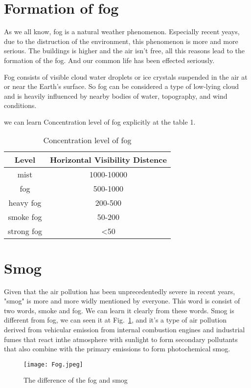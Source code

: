 \documentclass[10pt,twocolumn,letterpaper]{article}
\begin{document}
\section{Formation of fog}
 \par As we all know, fog is a natural weather phenomenon. Especially recent yeays, due to the distruction of the   environment, this phenomenon is more and more serious. The buildings is higher and the air isn't free, all this reasons lead to the formation of the fog. And our common life has been effected seriously. 
 \par Fog consists of visible cloud water droplets or ice crystals suspended in the air at or near the Earth's surface\cite{gultepe2008fog}. So fog can be considered a type of low-lying cloud and is heavily influenced by nearby bodies of water, topography, and wind conditions.
 \par we can learn Concentration level of fog explicitly at the table 1.
\begin{table}[htbp]
\centering
\caption{Concentration level of fog}
\begin{tabular}{c|c}
\hline
Level & Horizontal Visibility Distence \\
\hline
mist & 1000-10000 \\
fog & 500-1000 \\
heavy fog & 200-500 \\
smoke fog & 50-200 \\
strong fog & <50 \\
\hline 
\end{tabular} 
\end{table}

\section{Smog}
 \par Given that the air pollution has been unprecedentedly severe in recent years, "smog" is more and more widly mentioned by everyone. This word is consist of two words, smoke and fog. We can learn it clearly from these words. Smog is different from fog, we can seen it at Fig.~\ref{difference}, and it's a type of air pollution derived from vehicular emission from internal combustion engines and industrial fumes that react inthe atmosphere with sunlight to form secondary pollutants that also combine with the primary emissions to form photochemical smog.
\begin{figure}[t]
\begin{center}
\texttt{[image: Fog.jpeg]} %
\end{center}
   \caption{The difference of the fog and smog}
\label{difference}
\end{figure}
\end{document}
